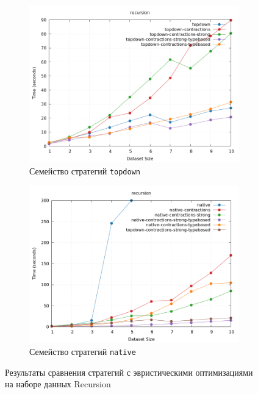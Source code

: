 \documentclass[../thesis.tex]{subfiles}
\begin{document}
\begin{figure}[h]
    \begin{subfigure}{0.5\textwidth}
    \includegraphics[width=\linewidth]{topdown.png} 
    \caption{Семейство стратегий \texttt{topdown}}
    \label{plot_heuristics_topdown}
    \end{subfigure}
    \begin{subfigure}{0.5\textwidth}
    \includegraphics[width=\linewidth]{native.png}
    \caption{Семейство стратегий \texttt{native}}
    \label{plot_heuristics_native}
    \end{subfigure}
    \caption{Результаты сравнения стратегий с эвристическими оптимизациями на наборе данных Recursion}
    \label{plot_heuristics}
\end{figure}
\end{document}
